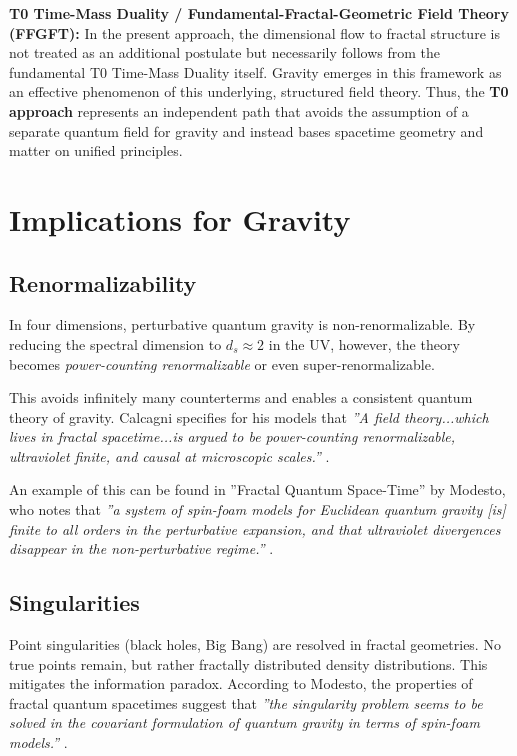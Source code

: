 	\textbf{T0 Time-Mass Duality / Fundamental-Fractal-Geometric Field Theory (FFGFT):} In the present approach, the dimensional flow to fractal structure is not treated as an additional postulate but necessarily follows from the fundamental T0 Time-Mass Duality itself. Gravity emerges in this framework as an effective phenomenon of this underlying, structured field theory. Thus, the \textbf{T0 approach} represents an independent path that avoids the assumption of a separate quantum field for gravity and instead bases spacetime geometry and matter on unified principles.
	
	\section{Implications for Gravity}
	
	\subsection{Renormalizability}
	In four dimensions, perturbative quantum gravity is non-renormalizable. By reducing the spectral dimension to $d_s \approx 2$ in the UV, however, the theory becomes \emph{power-counting renormalizable} or even super-renormalizable.
	
	This avoids infinitely many counterterms and enables a consistent quantum theory of gravity. Calcagni specifies for his models that \textit{''A field theory...which lives in fractal spacetime...is argued to be power-counting renormalizable, ultraviolet finite, and causal at microscopic scales.''} \cite{Calcagni2010a}.
	
	An example of this can be found in ''Fractal Quantum Space-Time'' by Modesto, who notes that \textit{''a system of spin-foam models for Euclidean quantum gravity [is] finite to all orders in the perturbative expansion, and that ultraviolet divergences disappear in the non-perturbative regime.''} \cite{Modesto2009}.
	
	\subsection{Singularities}
	Point singularities (black holes, Big Bang) are resolved in fractal geometries. No true points remain, but rather fractally distributed density distributions. This mitigates the information paradox. According to Modesto, the properties of fractal quantum spacetimes suggest that \textit{''the singularity problem seems to be solved in the covariant formulation of quantum gravity in terms of spin-foam models.''} \cite{Modesto2009}.
	
